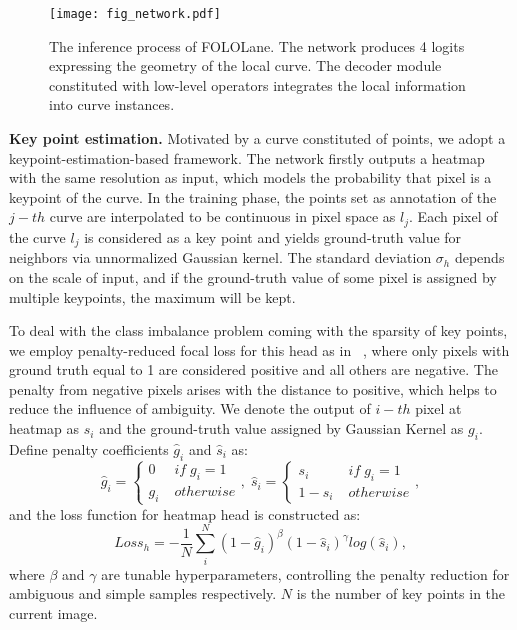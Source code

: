 \documentclass[final]{cvpr}
\begin{document}
\begin{figure}[t]
	\begin{center}
		\texttt{[image: fig\_network.pdf]}
	\end{center}
	\caption{The inference process of FOLOLane. The network produces 4 logits expressing the geometry of the local curve. The decoder module constituted with low-level operators integrates the local information into curve instances. }
	\label{fig:network}
\end{figure}


\textbf{Key point estimation.}  Motivated by a curve constituted of points, we adopt a keypoint-estimation-based framework. The network firstly outputs a heatmap with the same resolution as input, which models the probability that pixel is a keypoint of the curve. In the training phase, the points set as annotation of the $j-th$ curve are interpolated to be continuous in pixel space as $l_j$. Each pixel of the curve $l_j$ is considered as a key point and yields ground-truth value for neighbors via unnormalized Gaussian kernel. The standard deviation $\sigma_h$ depends on the scale of input, and if the ground-truth value of some pixel is assigned by multiple keypoints, the maximum will be kept.

To deal with the class imbalance problem coming with the sparsity of key points, we employ penalty-reduced focal loss for this head as in ~\cite{law2018cornernet,zhou2019object}, where only pixels with ground truth equal to 1 are considered positive and all others are negative. The penalty from negative pixels arises with the distance to positive, which helps to reduce the influence of ambiguity. We denote the output of $i-th$ pixel at heatmap as $s_i$ and the ground-truth value assigned by Gaussian Kernel as $g_i$. Define penalty coefficients $\hat{g}_i$ and $\hat{s}_i $ as:
\begin{equation}
	\hat{g}_i=
	\begin{cases}
		0 \; &if\; g_i=1 \\
		g_i \; &otherwise 
	\end{cases},\;
	\hat{s}_i=
	\begin{cases}
		s_i \; &if\; g_i=1 \\
		1-s_i \; &otherwise 
	\end{cases},
	\label{eq:reduction_factor}
\end{equation}
and the loss function for heatmap head is constructed as:
\begin{equation}
	Loss_{h}=-\frac{1}{N}\sum^N_i(1-\hat{g}_i)^\beta(1-\hat{s}_i)^\gamma log(\hat{s}_i),
	\label{eq:loss_cls}
\end{equation}
\noindent where $\beta$ and $\gamma$ are tunable hyperparameters, controlling the penalty reduction for ambiguous and simple samples respectively. $N$ is the number of key points in the current image.
\end{document}
